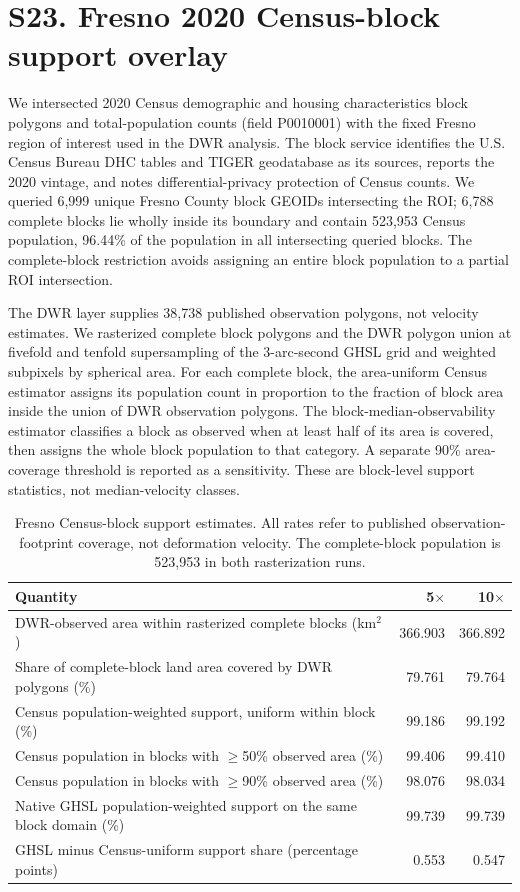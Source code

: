 \documentclass[10pt,a4paper]{article}
\begin{document}
\section*{S23. Fresno 2020 Census-block support overlay}

We intersected 2020 Census demographic and housing characteristics block polygons and total-population counts (field P0010001) with the fixed Fresno region of interest used in the DWR analysis. The block service identifies the U.S. Census Bureau DHC tables and TIGER geodatabase as its sources, reports the 2020 vintage, and notes differential-privacy protection of Census counts. We queried 6,999 unique Fresno County block GEOIDs intersecting the ROI; 6,788 complete blocks lie wholly inside its boundary and contain 523,953 Census population, 96.44\% of the population in all intersecting queried blocks. The complete-block restriction avoids assigning an entire block population to a partial ROI intersection.

The DWR layer supplies 38,738 published observation polygons, not velocity estimates. We rasterized complete block polygons and the DWR polygon union at fivefold and tenfold supersampling of the 3-arc-second GHSL grid and weighted subpixels by spherical area. For each complete block, the area-uniform Census estimator assigns its population count in proportion to the fraction of block area inside the union of DWR observation polygons. The block-median-observability estimator classifies a block as observed when at least half of its area is covered, then assigns the whole block population to that category. A separate 90\% area-coverage threshold is reported as a sensitivity. These are block-level support statistics, not median-velocity classes.

\begin{table}[htbp]\centering\small
\caption{Fresno Census-block support estimates. All rates refer to published observation-footprint coverage, not deformation velocity. The complete-block population is 523,953 in both rasterization runs.}
\begin{tabular}{lrr}\toprule
Quantity & 5$\times$ & 10$\times$ \\
\midrule
DWR-observed area within rasterized complete blocks (km$^2$) & 366.903 & 366.892 \\
Share of complete-block land area covered by DWR polygons (\%) & 79.761 & 79.764 \\
Census population-weighted support, uniform within block (\%) & 99.186 & 99.192 \\
Census population in blocks with $\geq$50\% observed area (\%) & 99.406 & 99.410 \\
Census population in blocks with $\geq$90\% observed area (\%) & 98.076 & 98.034 \\
Native GHSL population-weighted support on the same block domain (\%) & 99.739 & 99.739 \\
GHSL minus Census-uniform support share (percentage points) & 0.553 & 0.547 \\
\bottomrule\end{tabular}
\end{table}
\end{document}
